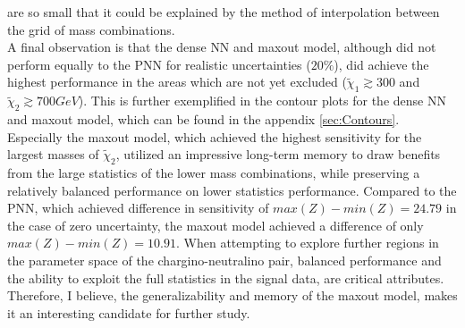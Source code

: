 are so small that it could be explained by the method of interpolation between the grid of mass combinations.
\\
A final observation is that the dense \ac{NN} and maxout model, although did not perform equally to the \ac{PNN} for realistic uncertainties ($20\%$), did achieve the highest performance in 
the areas which are not yet excluded ($\tilde{\chi}_1\gtrsim300$ and $\tilde{\chi}_2\gtrsim700GeV$). This is further exemplified in the contour plots for the dense \ac{NN} and maxout model, which 
can be found in the appendix \ref{sec:Contours}. Especially the maxout model, which achieved the highest sensitivity for the largest 
masses of $\tilde{\chi}_2$, utilized an impressive long-term memory to draw benefits from the large statistics of the lower mass combinations, while preserving a relatively balanced performance on 
lower statistics performance. Compared to the \ac{PNN}, which achieved difference in sensitivity of $max(Z)-min(Z) = 24.79$ in the case of zero uncertainty, the maxout model achieved a difference 
of only $max(Z)-min(Z) = 10.91$. When attempting to explore further regions in the parameter space of the chargino-neutralino pair, balanced performance and the ability to exploit the full statistics in the 
signal data, are critical attributes. Therefore, I believe, the generalizability and memory of the maxout model, makes it an interesting candidate for further study.
